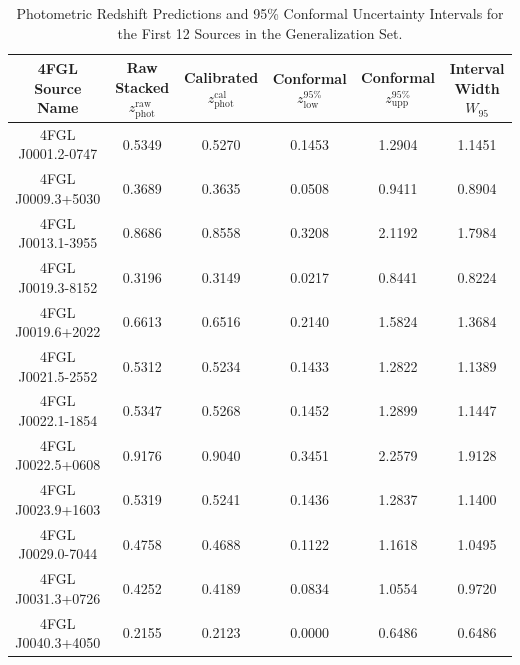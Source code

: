 \documentclass[twocolumn,linenumbers,floatfix]{aastex701}
\begin{document}
\begin{table}[t!]
\centering
\caption{Photometric Redshift Predictions and 95\% Conformal Uncertainty Intervals for the First 12 Sources in the Generalization Set.}
\label{tab:predictions_catalog}
\begin{tabular}{cccccc}
\hline\hline
4FGL Source Name & Raw Stacked $z_{\text{phot}}^{\text{raw}}$ & Calibrated $z_{\text{phot}}^{\text{cal}}$ & Conformal $z_{\text{low}}^{95\%}$ & Conformal $z_{\text{upp}}^{95\%}$ & Interval Width $W_{95}$ \\
\hline
    4FGL J0001.2-0747 & 0.5349 & 0.5270 & 0.1453 & 1.2904 & 1.1451 \\
    4FGL J0009.3+5030 & 0.3689 & 0.3635 & 0.0508 & 0.9411 & 0.8904 \\
    4FGL J0013.1-3955 & 0.8686 & 0.8558 & 0.3208 & 2.1192 & 1.7984 \\
    4FGL J0019.3-8152 & 0.3196 & 0.3149 & 0.0217 & 0.8441 & 0.8224 \\
    4FGL J0019.6+2022 & 0.6613 & 0.6516 & 0.2140 & 1.5824 & 1.3684 \\
    4FGL J0021.5-2552 & 0.5312 & 0.5234 & 0.1433 & 1.2822 & 1.1389 \\
    4FGL J0022.1-1854 & 0.5347 & 0.5268 & 0.1452 & 1.2899 & 1.1447 \\
    4FGL J0022.5+0608 & 0.9176 & 0.9040 & 0.3451 & 2.2579 & 1.9128 \\
    4FGL J0023.9+1603 & 0.5319 & 0.5241 & 0.1436 & 1.2837 & 1.1400 \\
    4FGL J0029.0-7044 & 0.4758 & 0.4688 & 0.1122 & 1.1618 & 1.0495 \\
    4FGL J0031.3+0726 & 0.4252 & 0.4189 & 0.0834 & 1.0554 & 0.9720 \\
    4FGL J0040.3+4050 & 0.2155 & 0.2123 & 0.0000 & 0.6486 & 0.6486 \\
\hline
\end{tabular}
\end{table}
\end{document}
